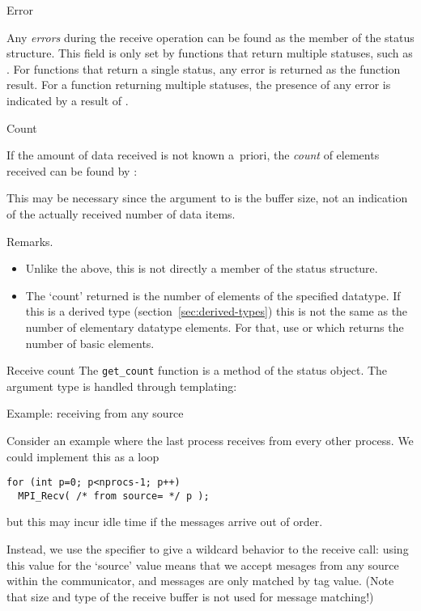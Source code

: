  {Error}
\label{sec:mpi-status-error}

Any \emph{errors}
during the receive operation can be found as the
member of the status structure.
This field is only set by functions that return multiple statuses,
such as .
For functions that return a single status, any error is returned
as the function result.
For a function returning multiple statuses, the presence of any error
is indicated by a result of .

 {Count}

If the amount of data received is not known a~priori, the
\emph{count} of elements received
can be found by 
:

This may be necessary since the  argument to  is 
the buffer size, not an indication of the actually received number of
data items.

Remarks.
\begin{itemize}
\item Unlike the above, this is not directly a member of the status
  structure.
\item The `count' returned is the number of elements of the specified
  datatype. If this is a derived type
  (section~\ref{sec:derived-types}) this is not the same as the number
  of elementary datatype elements. For that, use
   or
  which returns the number of basic elements.
\end{itemize}

\begin{mplnote}{Receive count}
  The \lstinline+get_count+ function is a method of the status object.
  The argument type is handled through templating:
\end{mplnote}

 {Example: receiving from any source}

Consider an example where the last process receives from every other process.
We could implement this as a loop
\begin{lstlisting}
for (int p=0; p<nprocs-1; p++)
  MPI_Recv( /* from source= */ p );
\end{lstlisting}
but this may incur idle time if the messages arrive out of order.

Instead, we use the   specifier to give a wildcard
behavior to the receive call: using this value for the `source' value
means that we accept mesages from any source within the communicator,
and messages are only matched by tag value.
(Note that size and type of the receive buffer is not used for message matching!)

